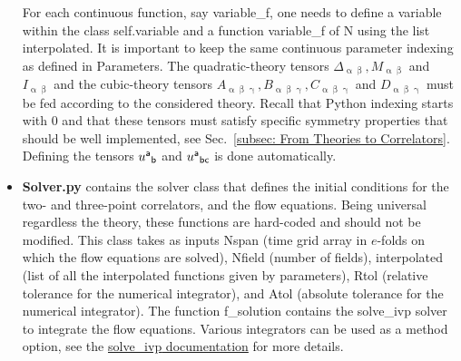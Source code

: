 \documentclass[11pt]{article}
\numberwithin{equation}{section} %
\begin{document}
\begin{itemize}
    \vskip 4pt
    For each continuous function, say \textsf{variable\_f}, one needs to define a variable within the class \textsf{self.variable} and a function \textsf{variable\_f} of \textsf{N} using the list \textsf{interpolated}. It is important to keep the same continuous parameter indexing as defined in \textsf{Parameters}. The quadratic-theory tensors $\Delta_{\upalpha\upbeta}, M_{\upalpha\upbeta}$ and $I_{\upalpha\upbeta}$ and the cubic-theory tensors $A_{\upalpha\upbeta\upgamma}, B_{\upalpha\upbeta\upgamma}, C_{\upalpha\upbeta\upgamma}$ and $D_{\upalpha\upbeta\upgamma}$ must be fed according to the considered theory. Recall that Python indexing starts with $0$ and that these tensors must satisfy specific symmetry properties that should be well implemented, see Sec.~\ref{subsec: From Theories to Correlators}. Defining the tensors $\tensor{u}{^{\mathsf{a}}}{_{\mathsf{b}}}$ and $\tensor{u}{^{\mathsf{a}}}{_{\mathsf{bc}}}$ is done automatically.
    
    \item \textbf{Solver.py} contains the \textsf{solver} class that defines the initial conditions for the two- and three-point correlators, and the flow equations. Being universal regardless the theory, these functions are hard-coded and should not be modified. This class takes as inputs \textsf{Nspan} (time grid array in $e$-folds on which the flow equations are solved), \textsf{Nfield} (number of fields), \textsf{interpolated} (list of all the interpolated functions given by \textsf{parameters}), \textsf{Rtol} (relative tolerance for the numerical integrator), and \textsf{Atol} (absolute tolerance for the numerical integrator). The function \textsf{f\_solution} contains the \textsf{solve\_ivp} solver to integrate the flow equations. Various integrators can be used as a \textsf{method} option, see the \href{https://docs.scipy.org/doc/scipy/reference/generated/scipy.integrate.solve_ivp.html}{\textsf{solve\_ivp} documentation} for more details. 
\end{itemize}
\end{document}

